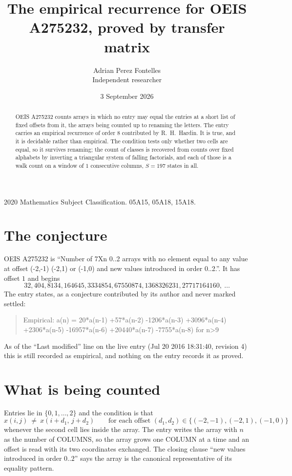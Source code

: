 \documentclass[11pt,a4paper]{article}
\title{The empirical recurrence for OEIS A275232, proved by transfer matrix}
\author{Adrian Perez Fontelles\\ \small Independent researcher}
\date{3 September 2026}
\theoremstyle{plain}
\theoremstyle{definition}
\begin{document}
\maketitle

\begin{abstract}
OEIS A275232 counts arrays in which no entry may equal the entries at a short list of fixed offsets
from it, the arrays being counted up to renaming the letters. The entry carries an empirical
recurrence of order $8$ contributed by R.~H.~Hardin. It is true, and it is decidable
rather than empirical. The condition tests only whether two cells are equal, so it survives
renaming; the count of classes is recovered from counts over fixed alphabets by inverting a
triangular system of falling factorials, and each of those is a walk count on a window of
$1$ consecutive columns, $S=197$ states in all.
\end{abstract}

\noindent\small 2020 Mathematics Subject Classification. 05A15, 05A18, 15A18.\normalsize

\section{The conjecture}

OEIS A275232 is ``Number of 7Xn 0..2 arrays with no element equal to any value at offset (-2,-1) (-2,1) or (-1,0) and new values introduced in order 0..2.''. It has offset $1$ and begins
\[
32, 404, 8134, 164645, 3334854, 67550874, 1368326231, 27717164160,\ \dots
\]
The entry states, as a conjecture contributed by its author and never marked settled:
\begin{quote}
Empirical: a(n) = 20*a(n-1) +57*a(n-2) -1206*a(n-3) +3096*a(n-4) +2306*a(n-5) -16957*a(n-6) +20440*a(n-7) -7755*a(n-8) for n>9
\end{quote}
As of the ``Last modified'' line on the live entry (Jul 20 2016 18:31:40, revision 4) this is still
recorded as empirical, and nothing on the entry records it as proved.

\section{What is being counted}

Entries lie in $\{0,1,\dots,2\}$ and the condition is that
\[
x(i,j)\ \ne\ x(i+d_1,\,j+d_2)\qquad\text{for each offset }(d_1,d_2)\in\{(-2,-1), (-2,1), (-1,0)\}
\]
whenever the second cell lies inside the array. The entry writes the array with $n$ as the number of COLUMNS, so the array grows one COLUMN at a time and an offset is read with its two coordinates exchanged. The closing clause ``new values
introduced in order $0..2$'' says the array is the canonical representative of its equality
pattern.
\end{document}
